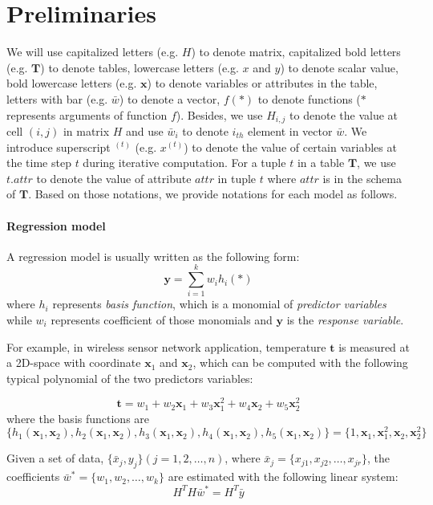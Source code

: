 \section{Preliminaries}
We will use capitalized letters (e.g. $H$) to denote matrix, capitalized bold letters (e.g. $\textbf{T}$) to denote tables, lowercase letters (e.g. $x$ and $y$) to denote scalar value, bold lowercase letters (e.g. $\textbf{x}$) to denote variables or attributes in the table, letters with bar (e.g. $\bar{w}$) to denote a vector, $f(*)$ to denote functions ($*$ represents arguments of function $f$). Besides, we use $H_{i,j}$ to denote the value at cell $(i,j)$ in matrix $H$ and use $\bar{w}_i$ to denote $i_{th}$ element in vector $\bar{w}$. We introduce superscript $^{(t)}$ (e.g. $x^{(t)}$) to denote the value of certain variables at the time step $t$ during iterative computation. For a tuple $t$ in a table $\textbf{T}$, we use $t.attr$ to denote the value of attribute $attr$ in tuple $t$ where $attr$ is in the schema of $\textbf{T}$. Based on those notations, we provide notations for each model as follows.

\paragraph{Regression model}
A regression model is usually written as the following form:
\begin{equation}
\textbf{y}=\sum_{i=1}^kw_ih_i(*)
\end{equation}
where $h_i$ represents {\em basis function}, which is a monomial of {\em predictor variables} while $w_i$ represents coefficient of those monomials and $\textbf{y}$ is the {\em response variable}.

For example, in wireless sensor network application, temperature $\textbf{t}$ is measured at a 2D-space with coordinate $\textbf{x}_1$ and $\textbf{x}_2$, which can be computed with the following typical polynomial of the two predictors variables:

\begin{equation}
\textbf{t}=w_1 + w_2\textbf{x}_1+w_3\textbf{x}_1^2 + w_4\textbf{x}_2+w_5\textbf{x}_2^2
\end{equation}
where the basis functions are $\{h_1(\textbf{x}_1,\textbf{x}_2), h_2(\textbf{x}_1,\textbf{x}_2), h_3(\textbf{x}_1,\textbf{x}_2),h_4(\textbf{x}_1,\textbf{x}_2), h_5(\textbf{x}_1,\textbf{x}_2)\}=\{1, \textbf{x}_1, \textbf{x}_1^2, \textbf{x}_2, \textbf{x}_2^2\}$

Given a set of data, $\{\bar{x}_j,y_j\}(j=1,2,\dots,n)$, where $\bar{x}_j=\{x_{j1},x_{j2}, \dots, x_{jr}\}$, the coefficients $\bar{w}^* = \{w_1,w_2,\dots,w_k\}$ are estimated with the following linear system:
\begin{equation}\label{eq: regression_solve}
    H^TH\bar{w}^*=H^T\bar{y}
\end{equation}

